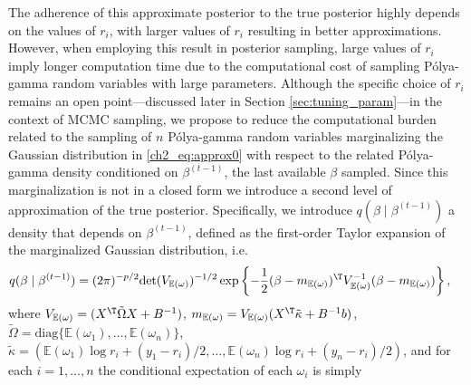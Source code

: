 The adherence of this approximate posterior to the true posterior highly depends on the values of $r_i$, with larger values of $r_i$ resulting in better approximations. However, when employing this result in posterior sampling, large values of $r_i$ imply longer computation time due to the computational cost of sampling P\'olya-gamma random variables with large parameters. Although the specific choice of $r_i$ remains an open point---discussed later in Section \ref{sec:tuning_param}---in the context of MCMC sampling, we propose to reduce the computational burden related to the sampling of $n$  P\'olya-gamma  random variables marginalizing the Gaussian distribution in \eqref{ch2_eq:approx0} with respect to the related P\'olya-gamma density conditioned on $\beta^{(t-1)}$,  the last available $\beta$ sampled. Since this marginalization is not in a closed form we introduce a second level of approximation of the true posterior. Specifically, we introduce $q(\beta \mid \beta^{(t-1)})$ a density that depends on $\beta^{(t-1)}$, defined as the first-order Taylor expansion of the marginalized Gaussian distribution, i.e. 
\begin{equation}
\begin{aligned}
q(\beta\mid \beta^{(t-1)}) & = %
(2\pi)^{-p/2} \mathrm{det}(V_{\mathbb{E}(\omega)})^{-1/2} \exp\left\{-\frac{1}{2}(\beta - m_{\mathbb{E}(\omega)})^\T V_{\mathbb{E}(\omega)}^{-1} (\beta - m_{\mathbb{E}(\omega)})\right\},
\end{aligned}
\label{ch2_eq:approx2}
\end{equation}
where $V_{\mathbb{E}(\omega)} = (X^\T \tilde{\Omega} X + B^{-1})$, $m_{\mathbb{E}(\omega)} = V_{\mathbb{E}(\omega)}(X^\T \tilde{\kappa} + B^{-1}b)$, 
$\tilde{\Omega}  = \mathrm{diag} \{ \mathbb{E}(\omega_1),\dots,\mathbb{E}(\omega_n)\}$, $\tilde{\kappa} = (\mathbb{E}(\omega_1) \log r_i + (y_1-r_i)/2, \dots, \mathbb{E}(\omega_n) \log r_i + (y_n-r_i)/2)$, and for each $i = 1, \dots, n$ the conditional expectation of each $\omega_i$ is simply 
